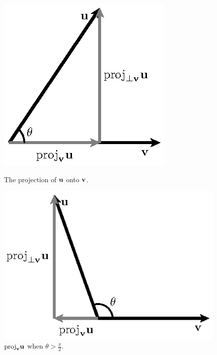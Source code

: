 \begin{figure}[ht]
  \begin{center}
    \begin{minipage}{3in}
      \begin{center}
        \includegraphics{figures/fig_9_3_projection_1.eps}
        \caption{The projection of $\mathbf{u}$ onto $\mathbf{v}$.}
        \label{F:9.3.Projection}
      \end{center}
    \end{minipage}
    \begin{minipage}{3in}
      \begin{center}
        \includegraphics{figures/fig_9_3_projection_2.eps}
        \caption{$\text{proj}_{\mathbf{v}} \mathbf{u}$ when $\theta > \frac\pi2$.}
        \label{F:9.3.Projection2}
      \end{center}
    \end{minipage}
  \end{center}
\end{figure}

